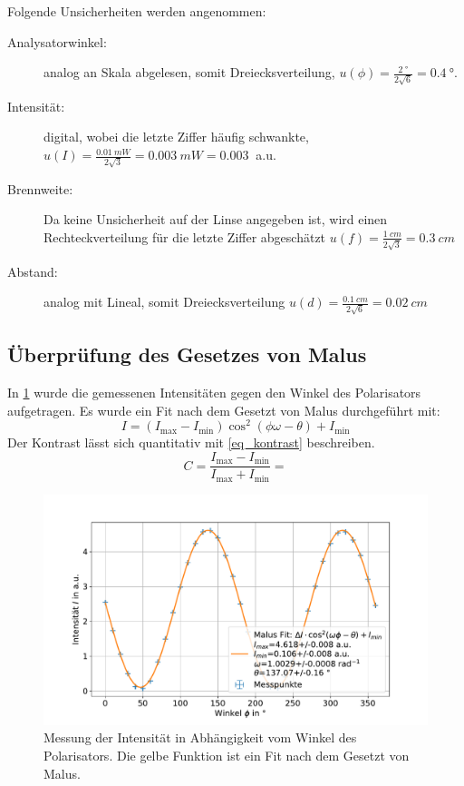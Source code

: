 \documentclass[
	a4paper,
	12pt,
	pagesize,
	ngerman
]{scrartcl}
\begin{document}
	Folgende Unsicherheiten werden angenommen:
	\begin{description}
		\item[Analysatorwinkel:] analog an Skala abgelesen, somit Dreiecksverteilung, $u(\phi)=\frac{\SI{2}{\degree}}{2\sqrt{6}}=\SI{0.4}{\degree}$.
		\item[Intensität:] digital, wobei die letzte Ziffer häufig schwankte, $u(I)=\frac{\SI{0.01}{mW}}{2\sqrt{3}}=\SI{0.003}{mW}=\SI{0.003}{}$ a.u.
		\item[Brennweite:] Da keine Unsicherheit auf der Linse angegeben ist, wird einen Rechteckverteilung für die letzte Ziffer abgeschätzt $u(f)=\frac{\SI{1}{cm}}{2\sqrt{3}}= \SI{0.3}{cm}$
		\item[Abstand:] analog mit Lineal, somit Dreiecksverteilung $u(d)=\frac{\SI{0.1}{cm}}{2\sqrt{6}}= \SI{0.02}{cm}$
	\end{description}
		\subsection{Überprüfung des Gesetzes von Malus}\label{ss_malus}
		In \cref{fig_malus} wurde die gemessenen Intensitäten gegen den Winkel des Polarisators aufgetragen.
		Es wurde ein Fit nach dem Gesetzt von Malus durchgeführt mit:
		\begin{equation}
			\label{eq_malus_fit}
			I = (I_\text{max}-I_\text{min})\cos^2(\phi\omega-\theta) +I_\text{min}
		\end{equation}
		Der Kontrast lässt sich quantitativ mit \cref{eq_kontrast} beschreiben.
		\begin{equation}
			\label{eq_kontrast}
			C = \frac{I_\text{max}-I_\text{min}}{I_\text{max}+I_\text{min}}= 
		\end{equation}

	\begin{figure}[H]
			\includegraphics[width=0.8\linewidth]{img/malus}
			\caption{
			Messung der Intensität in Abhängigkeit vom Winkel des Polarisators.
			Die gelbe Funktion ist ein Fit nach dem Gesetzt von Malus.
			}
			\label{fig_malus}
	\end{figure}
\end{document}
